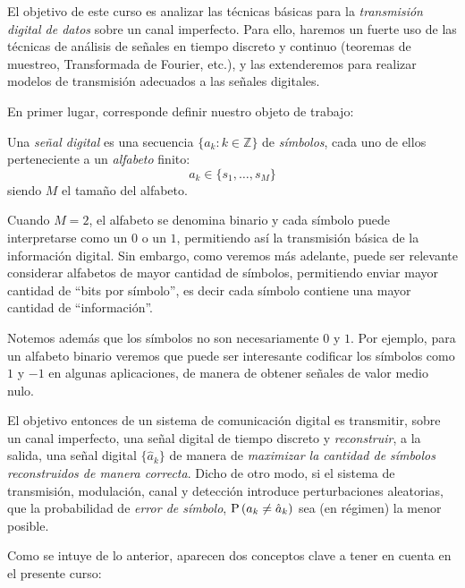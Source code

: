 El objetivo de este curso es analizar las técnicas básicas para la \emph{transmisión digital de datos} sobre un canal imperfecto. Para ello, haremos un fuerte uso de las técnicas de análisis de señales en tiempo discreto y continuo (teoremas de muestreo, Transformada de Fourier, etc.), y las extenderemos para realizar modelos de transmisión adecuados a las señales digitales.

En primer lugar, corresponde definir nuestro objeto de trabajo:

\begin{definicion}
    Una \emph{señal digital} es una secuencia $\{a_k:k\in\mathbb{Z}\}$ de \emph{símbolos}, cada uno de ellos perteneciente a un \emph{alfabeto} finito:
    \begin{equation*}
        a_k \in \{s_1,\ldots,s_M\}
    \end{equation*} 
    siendo $M$ el tamaño del alfabeto.
\end{definicion}

Cuando $M=2$, el alfabeto se denomina binario y cada símbolo puede interpretarse como un $0$ o un $1$, permitiendo así la transmisión básica de la información digital. Sin embargo, como veremos más adelante, puede ser relevante considerar alfabetos de mayor cantidad de símbolos, permitiendo enviar mayor cantidad de ``bits por símbolo'', es decir cada símbolo contiene una mayor cantidad de ``información''.

Notemos además que los símbolos no son necesariamente $0$ y $1$. Por ejemplo, para un alfabeto binario veremos que puede ser interesante codificar los símbolos como $1$ y $-1$ en algunas aplicaciones, de manera de obtener señales de valor medio nulo.

El objetivo entonces de un sistema de comunicación digital es transmitir, sobre un canal imperfecto, una señal digital de tiempo discreto y \emph{reconstruir}, a la salida, una señal digital $\{\hat{a}_k\}$ de manera de \emph{maximizar la cantidad de símbolos reconstruidos de manera correcta}. Dicho de otro modo, si el sistema de transmisión, modulación, canal y detección introduce perturbaciones aleatorias, que la probabilidad de \emph{error de símbolo}, $\mathrm{P}\left(a_k\neq \hat{a}_k\right)$ sea (en régimen) la menor posible.

Como se intuye de lo anterior, aparecen dos conceptos clave a tener en cuenta en el presente curso:

